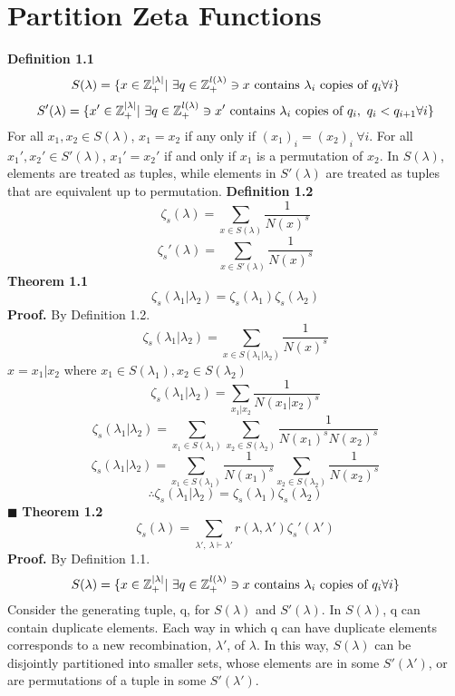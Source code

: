 \documentclass[12pt]{article}
\begin{document}
\section{Partition Zeta Functions}
\textbf{Definition 1.1}
\[S(\lambda) = \{x \in \mathbb{Z}_+^{|\lambda|}|\ \exists q \in \mathbb{Z}_+^{l(\lambda)} \ni x \newline \textup{ contains } \lambda_i \textup{ copies of } q_i \forall i\}\]
\[S'(\lambda) = \{x' \in \mathbb{Z}_+^{|\lambda|}|\ \exists q \in \mathbb{Z}_+^{l(\lambda)} \ni x' \newline \textup{ contains } \lambda_i \textup{ copies of } q_i,\ q_i < q_{i+1} \forall i\}\]
For all \(x_1,x_2 \in S(\lambda)\), \(x_1 = x_2\) if any only if \((x_1)_i = (x_2)_i\ \forall i\). \newline
For all \(x_1',x_2' \in S'(\lambda)\), \(x_1' = x_2'\) if and only if \(x_1\) is a permutation of \(x_2\).
\newline
In \(S(\lambda)\), elements are treated as tuples, while elements in \(S'(\lambda)\) are treated as tuples that are equivalent up to permutation.
\newline
\textbf{Definition 1.2}
\[\zeta_s(\lambda) = \sum_{x \in S(\lambda)}\frac{1}{N(x)^s}\]
\[\zeta_s'(\lambda) = \sum_{x \in S'(\lambda)}\frac{1}{N(x)^s}\]
\textbf{Theorem 1.1}
\[\zeta_s(\lambda_1|\lambda_2) = \zeta_s(\lambda_1)\zeta_s(\lambda_2)\]
\textbf{Proof.}
\newline
By Definition 1.2.
\[\zeta_s(\lambda_1|\lambda_2) = \sum_{x \in S(\lambda_1|\lambda_2)}\frac{1}{N(x)^s}\]
\(x = x_1|x_2\) where \(x_1\in S(\lambda_1), x_2 \in S(\lambda_2)\)
\[\zeta_s(\lambda_1|\lambda_2) = \sum_{x_1|x_2}\frac{1}{N(x_1|x_2)^s}\]
\[\zeta_s(\lambda_1|\lambda_2) = \sum_{x_1 \in S(\lambda_1)}\sum_{x_2 \in S(\lambda_2)}\frac{1}{N(x_1)^sN(x_2)^s}\]
\[\zeta_s(\lambda_1|\lambda_2) = \sum_{x_1 \in S(\lambda_1)}\frac{1}{N(x_1)^s}\sum_{x_2 \in S(\lambda_2)}\frac{1}{N(x_2)^s}\]
\[\therefore \zeta_s(\lambda_1|\lambda_2) = \zeta_s(\lambda_1)\zeta_s(\lambda_2)\]
\(\blacksquare\) \newline
\textbf{Theorem 1.2}
\[\zeta_s(\lambda) = \sum_{\lambda',\ \lambda \vdash \lambda'} r(\lambda,\lambda')\zeta_s'(\lambda')\]
\textbf{Proof.}
\newline
By Definition 1.1.
\[S(\lambda) = \{x \in \mathbb{Z}_+^{|\lambda|}|\ \exists q \in \mathbb{Z}_+^{l(\lambda)} \ni x \newline \textup{ contains } \lambda_i \textup{ copies of } q_i \forall i\}\]
Consider the generating tuple, q, for \(S(\lambda)\) and \(S'(\lambda)\). In \(S(\lambda)\), q can contain duplicate elements. Each way in which q can have duplicate elements corresponds to a new recombination, \(\lambda'\), of \(\lambda\). In this way, \(S(\lambda)\) can be disjointly partitioned into smaller sets, whose elements are in some \(S'(\lambda')\), or are permutations of a tuple in some \(S'(\lambda')\).
\end{document}
